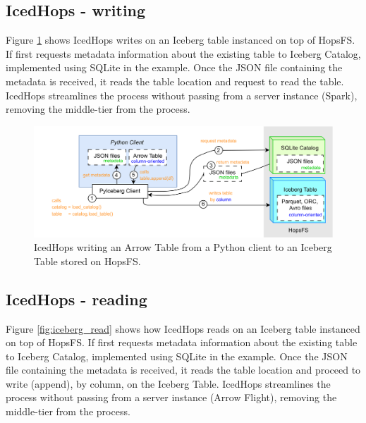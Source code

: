 \subsection{IcedHops - writing}
\label{subsec:back_sys_iceberg_write}

Figure \ref{fig:iceberg_write} shows IcedHops writes on an Iceberg table instanced on top of \gls{HopsFS}. If first requests metadata information about the existing table to Iceberg Catalog, implemented using SQLite in the example. Once the JSON file containing the metadata is received, it reads the table location and request to read the table. IcedHops streamlines the process without passing from a server instance (Spark), removing the middle-tier from the process.

\begin{figure}
    \begin{center}
      \includegraphics[width=\textwidth]{figures/2-background_and_related_work/iceberg_write.png}
    \end{center}
    \caption[IcedHops - write process]{IcedHops writing an Arrow Table from a Python client to an Iceberg Table stored on \gls{HopsFS}.}
    \label{fig:iceberg_write}
\end{figure}



\subsection{IcedHops - reading}
\label{subsec:back_sys_iceberg_read}

Figure \ref{fig:iceberg_read} shows how IcedHops reads on an Iceberg table instanced on top of \gls{HopsFS}. If first requests metadata information about the existing table to Iceberg Catalog, implemented using SQLite in the example. Once the JSON file containing the metadata is received, it reads the table location and proceed to write (append), by column, on the Iceberg Table. IcedHops streamlines the process without passing from a server instance (Arrow Flight), removing the middle-tier from the process.

